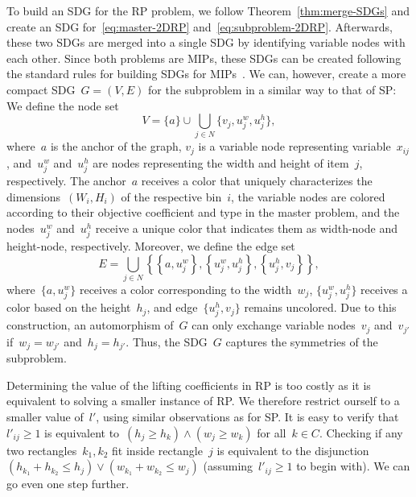 \documentclass[a4paper,10pt]{article}
\newcommand{\lift}{l}
\newcommand{\rectanglepack}{RP\xspace}
\newcommand{\spherepack}{SP\xspace}
\newcommand{\brackets}[1]{\left\{ #1 \right\}}
\theoremstyle{definition}
\begin{document}
To build an SDG for the \rectanglepack problem, we follow Theorem~\ref{thm:merge-SDGs} and create an SDG for~\eqref{eq:master-2DRP} and~\eqref{eq:subproblem-2DRP}.
Afterwards, these two SDGs are merged into a single SDG by identifying variable nodes with each other.
Since both problems are MIPs, these SDGs can be created following the standard rules for building SDGs for MIPs~\cite{Salvagnin2005}.
We can, however, create a more compact SDG~$G=(V, E)$ for the subproblem in a similar way to that of \spherepack:
We define the node set
\[
  V = \{a\} \cup \bigcup_{j \in N} \{v_j, u^w_j, u^h_j\},
\]
where~$a$ is the anchor of the graph, $v_j$ is a variable node representing variable~$x_{ij}$, and~$u^w_j$ and~$u^h_j$ are nodes representing the width and height of item~$j$, respectively.
The anchor~$a$ receives a color that uniquely characterizes the dimensions~$(W_i,H_i)$ of the respective bin~$i$, the variable nodes are colored according to their objective coefficient and type in the master problem, and the nodes~$u^w_j$ and~$u^h_j$ receive a unique color that indicates them as width-node and height-node, respectively.
Moreover, we define the edge set
\[
  E = \bigcup_{j \in N} \brackets{
    \brackets{a,u^w_j}, \brackets{u^w_j,u^h_j},\brackets{u^h_j,v_j}
    },
\]
where~$\{a,u^w_j\}$ receives a color corresponding to the width~$w_j$, $\{u^w_j,u^h_j\}$ receives a color based on the height~$h_j$, and edge~$\{u^h_j,v_j\}$ remains uncolored.
Due to this construction, an automorphism of~$G$ can only exchange variable nodes~$v_j$ and~$v_{j'}$ if~$w_j = w_{j'}$ and~$h_j = h_{j'}$.
Thus, the SDG~$G$ captures the symmetries of the subproblem.

Determining the value of the lifting coefficients in \rectanglepack is too costly as it is equivalent to solving a smaller instance of \rectanglepack.
We therefore restrict ourself to a smaller value of~$\lift'$, using similar observations as for \spherepack. 
It is easy to verify that~$\lift'_{ij} \geq 1$ is equivalent to~$(h_j \geq h_k)\wedge (w_j \geq w_k)$ for all~$k\in C$.
Checking if any two rectangles~$k_1, k_2$ fit inside rectangle~$j$ is equivalent to the disjunction~$(h_{k_1} + h_{k_2} \leq h_j) \lor (w_{k_1} + w_{k_2} \leq w_j)$ (assuming~$\lift'_{ij} \geq 1$ to begin with).
We can go even one step further.
\end{document}
